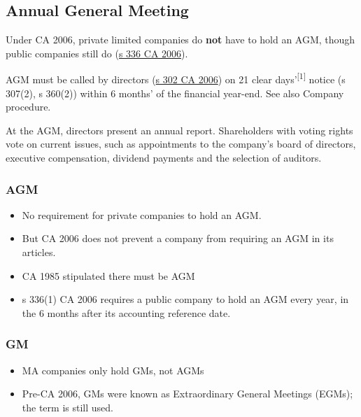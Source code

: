 \documentclass[
]{article}
\providecommand{\tightlist}{%
  \setlength{\itemsep}{0pt}\setlength{\parskip}{0pt}}
\begin{document}
\hypertarget{annual-general-meeting}{%
\subsection{Annual General Meeting}\label{annual-general-meeting}}

Under CA 2006, private limited companies do \textbf{not} have to hold an
AGM, though public companies still do
(\href{https://www.legislation.gov.uk/ukpga/2006/46/section/336}{s 336
CA 2006}).

AGM must be called by directors
(\href{https://www.legislation.gov.uk/ukpga/2006/46/section/302}{s 302
CA 2006}) on 21 clear days'\textsuperscript{{[}1{]}} notice (s 307(2), s
360(2)) within 6 months' of the financial year-end. See also Company
procedure.

At the AGM, directors present an annual report. Shareholders with voting
rights vote on current issues, such as appointments to the company's
board of directors, executive compensation, dividend payments and the
selection of auditors.

\hypertarget{agm}{%
\subsubsection{AGM}\label{agm}}

\begin{itemize}
\tightlist
\item
  No requirement for private companies to hold an AGM.
\item
  But CA 2006 does not prevent a company from requiring an AGM in its
  articles.
\item
  CA 1985 stipulated there must be AGM
\item
  s 336(1) CA 2006 requires a public company to hold an AGM every year,
  in the 6 months after its accounting reference date.
\end{itemize}

\hypertarget{gm}{%
\subsubsection{GM}\label{gm}}

\begin{itemize}
\tightlist
\item
  MA companies only hold GMs, not AGMs
\item
  Pre-CA 2006, GMs were known as Extraordinary General Meetings (EGMs);
  the term is still used.
\end{itemize}
\end{document}
